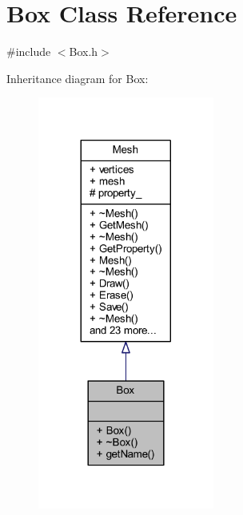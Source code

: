 \hypertarget{class_box}{}\section{Box Class Reference}
\label{class_box}


{\ttfamily \#include $<$Box.\+h$>$}



Inheritance diagram for Box\+:\nopagebreak
\begin{figure}[H]
\begin{center}
\leavevmode
\includegraphics[width=164pt]{class_box__inherit__graph}
\end{center}
\end{figure}


